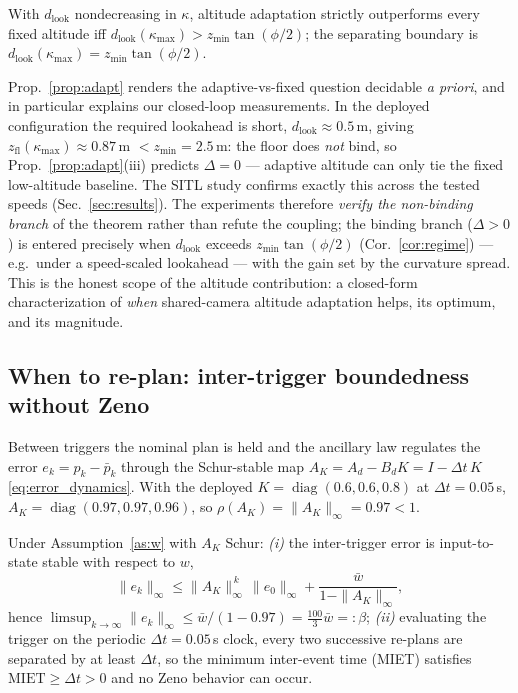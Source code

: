 \begin{corollary}\label{cor:regime}
With $d_{\mathrm{look}}$ nondecreasing in $\kappa$, altitude adaptation strictly outperforms every fixed altitude
iff $d_{\mathrm{look}}(\kappa_{\max})>z_{\min}\tan(\phi/2)$; the separating boundary is
$d_{\mathrm{look}}(\kappa_{\max})=z_{\min}\tan(\phi/2)$.
\end{corollary}

\begin{remark}\label{rem:regime}
Prop.~\ref{prop:adapt} renders the adaptive-vs-fixed question decidable \emph{a priori}, and in particular
explains our closed-loop measurements. In the deployed configuration the required lookahead is short,
$d_{\mathrm{look}}\!\approx\!0.5$\,m, giving $z_{\mathrm{fl}}(\kappa_{\max})\!\approx\!0.87$\,m $<z_{\min}=2.5$\,m: the
floor does \emph{not} bind, so Prop.~\ref{prop:adapt}(iii) predicts $\Delta=0$ --- adaptive altitude can only tie
the fixed low-altitude baseline. The SITL study confirms exactly this across the tested speeds
(Sec.~\ref{sec:results}). The experiments therefore \emph{verify the non-binding branch} of the theorem rather
than refute the coupling; the binding branch ($\Delta>0$) is entered precisely when $d_{\mathrm{look}}$ exceeds
$z_{\min}\tan(\phi/2)$ (Cor.~\ref{cor:regime}) --- e.g.\ under a speed-scaled lookahead --- with the gain set by the
curvature spread. This is the honest scope of the altitude contribution: a closed-form characterization of
\emph{when} shared-camera altitude adaptation helps, its optimum, and its magnitude.
\end{remark}

\subsection{When to re-plan: inter-trigger boundedness without Zeno}

Between triggers the nominal plan is held and the ancillary law regulates the
error $e_k=p_k-\bar p_k$ through the Schur-stable map
$A_K=A_d-B_dK=I-\Delta t\,K$ \eqref{eq:error_dynamics}. With the deployed
$K=\operatorname{diag}(0.6,0.6,0.8)$ at $\Delta t=0.05$\,s,
$A_K=\operatorname{diag}(0.97,0.97,0.96)$, so $\rho(A_K)=\|A_K\|_\infty=0.97<1$.

\begin{proposition}\label{prop:iss}
Under Assumption~\ref{as:w} with $A_K$ Schur:
\emph{(i)} the inter-trigger error is input-to-state stable with respect to $w$,
\begin{equation}
\|e_k\|_\infty\le \|A_K\|_\infty^{\,k}\,\|e_0\|_\infty
+\frac{\bar w}{1-\|A_K\|_\infty},
\label{eq:issbound}
\end{equation}
hence $\limsup_{k\to\infty}\|e_k\|_\infty\le \bar w/(1-0.97)=\tfrac{100}{3}\bar w=:\beta$;
\emph{(ii)} evaluating the trigger on the periodic $\Delta t=0.05$\,s clock,
every two successive re-plans are separated by at least $\Delta t$, so the
minimum inter-event time (MIET) satisfies $\mathrm{MIET}\ge\Delta t>0$ and no
Zeno behavior can occur.
\end{proposition}

